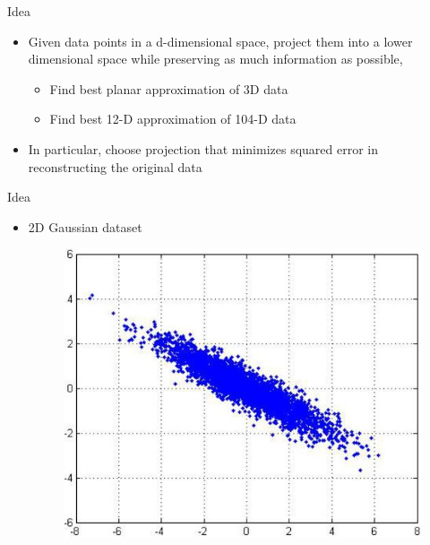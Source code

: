 \documentclass[serif, aspectratio=169]{beamer}
\begin{document}
\begin{frame}{Idea}
    \begin{itemize}
        \item Given data points in a d-dimensional space, project them into a lower dimensional space while preserving as much information as possible,
        \begin{itemize}
            \item Find best planar approximation of 3D data
            \item Find best 12-D approximation of 104-D data
        \end{itemize}
        \item In particular, choose projection that minimizes squared error in reconstructing the original data
    \end{itemize}
\end{frame}

\begin{frame}{Idea}
    \begin{itemize}
        \item 2D Gaussian dataset
         \begin{figure}[htpb]
            \begin{center}
                \includegraphics[keepaspectratio, scale=0.6]{pic/pcaData.JPG}
            \end{center}
        \end{figure}
    \end{itemize}
\end{frame}
\end{document}
